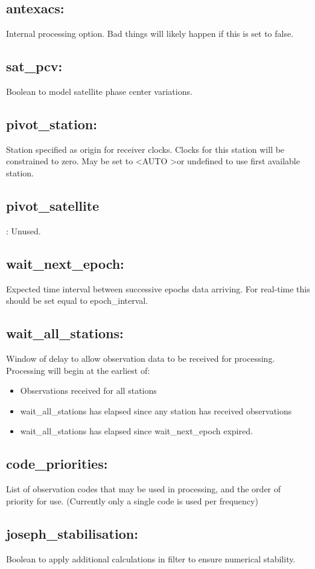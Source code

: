 \subsection*{antexacs:}
Internal processing option. Bad things will likely happen if this is set to false.
\subsection*{sat\_pcv:}
Boolean to model satellite phase center variations.
\subsection*{pivot\_station:}
Station specified as origin for receiver clocks. Clocks for this station will be constrained to zero. May be set to \textless AUTO \textgreater or undefined to use first available station.
\subsection*{pivot\_satellite}:
Unused.
\subsection*{wait\_next\_epoch:}
Expected time interval between successive epochs data arriving. For real-time this should be set equal to epoch\_interval.
\subsection*{wait\_all\_stations:}
Window of delay to allow observation data to be received for processing.
Processing will begin at the earliest of:
\begin{itemize}
\item Observations received for all stations
\item wait\_all\_stations has elapsed since any station has received observations
\item wait\_all\_stations has elapsed since wait\_next\_epoch expired.
\end{itemize}

\subsection*{code\_priorities:}
List of observation codes that may be used in processing, and the order of priority for use. (Currently only a single code is used per frequency)

\subsection*{joseph\_stabilisation:}
Boolean to apply additional calculations in filter to ensure numerical stability.











